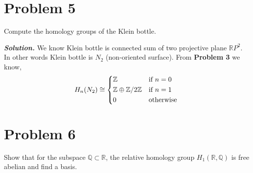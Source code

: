 \documentclass[11pt]{article}
\newcommand{\bb}[1]{\mathbb{#1}}
\newcommand{\Z}{\bb{Z}}
\newcommand{\R}{\mathbb{R}}
\newcommand{\sol}{ \textbf{\textit{Solution.}} }
\begin{document}
 \section{Problem 5}

 \begin{prob}{}{}
    Compute the homology groups of the Klein bottle.
 \end{prob}
 \sol We know Klein bottle is connected sum of two projective plane $\R P^2$. In other words Klein bottle is $N_2$ (non-oriented surface). From \textbf{\textsf{Problem 3}} we know, 
 \[
 H_n(N_2) \cong \begin{cases*}
   \Z & if $n = 0$ \\
   \Z \oplus \Z /2\Z & if $n =1$ \\
   0 & otherwise
 \end{cases*}  
 \]

 \section{Problem 6}

 \begin{prob}{}{}
    Show that for the subspace $\mathbb{Q} \subset \mathbb{R}$, the relative homology group $H_{1}(\mathbb{R}, \mathbb{Q})$ is free abelian and find a basis.
 \end{prob}
\end{document}
